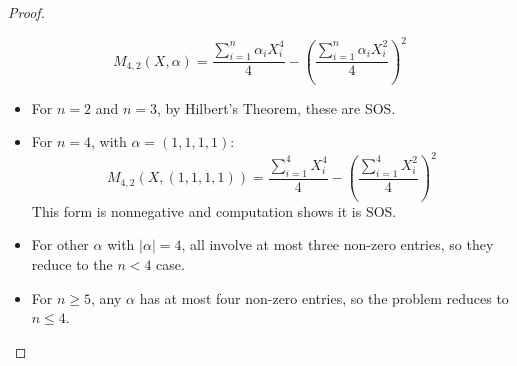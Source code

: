 \documentclass{article}
\begin{document}
\begin{proof}
\begin{enumerate}
      \[
         M_{4,2}(X, \alpha) = \frac{\sum_{i=1}^n \alpha_i X_i^4}{4} - \left( \frac{\sum_{i=1}^n \alpha_i X_i^2}{4} \right)^2
      \]
      \begin{itemize}
         \item For $n=2$ and $n=3$, by Hilbert's Theorem, these are SOS.
         \item For $n=4$, with $\alpha = (1,1,1,1)$:
         \[
            M_{4,2}(X, (1,1,1,1)) = \frac{\sum_{i=1}^4 X_i^4}{4} - \left( \frac{\sum_{i=1}^4 X_i^2}{4} \right)^2
         \]
         This form is nonnegative and computation shows it is SOS.
         \item For other $\alpha$ with $|\alpha|=4$, all involve at most three non-zero entries, so they reduce to the
         $n<4$ case.
         \item For $n \geq 5$, any $\alpha$ has at most four non-zero entries, so the problem reduces to $n \leq 4$.
      \end{itemize}
\end{enumerate}


\end{proof}
\end{document}

